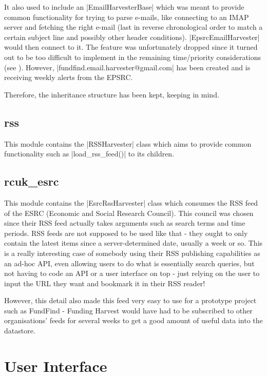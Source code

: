 It also used to include an |EmailHarvesterBase| which was meant to provide common functionality for trying to parse e-mails, like connecting to an IMAP server and fetching the right e-mail (last in reverse chronological order to match a certain subject line and possibly other header conditions). |EpsrcEmailHarvester| would then connect to it. The feature was unfortunately dropped since it turned out to be too difficult to implement in the remaining time/priority considerations (see ). However, |fundfind.email.harvester@gmail.com| has been created and is receiving weekly alerts from the EPSRC.

Therefore, the inheritance structure has been kept, keeping  in mind.

\subsection{rss}
This module contains the |RSSHarvester| class which aims to provide common functionality such as |load_rss_feed()| to its children.

\subsection{rcuk\_esrc}
\label{design-rcuk-esrc}
This module contains the |EsrcRssHarvester| class which consumes the RSS feed of the ESRC (Economic and Social Research Council). This council was chosen since their RSS feed \cite{esrc-rss} actually takes arguments such as search terms and time periods. RSS feeds are not supposed to be used like that - they ought to only contain the latest items since a server-determined date, usually a week or so. This is a really interesting case of somebody using their RSS publishing capabilities as an ad-hoc API, even allowing users to do what is essentially search queries, but not having to code an API or a user interface on top - just relying on the user to input the URL they want and bookmark it in their RSS reader!

However, this detail also made this feed very easy to use for a prototype project such as FundFind - Funding Harvest would have had to be subscribed to other organisations' feeds for several weeks to get a good amount of useful data into the datastore.

\section{User Interface}

